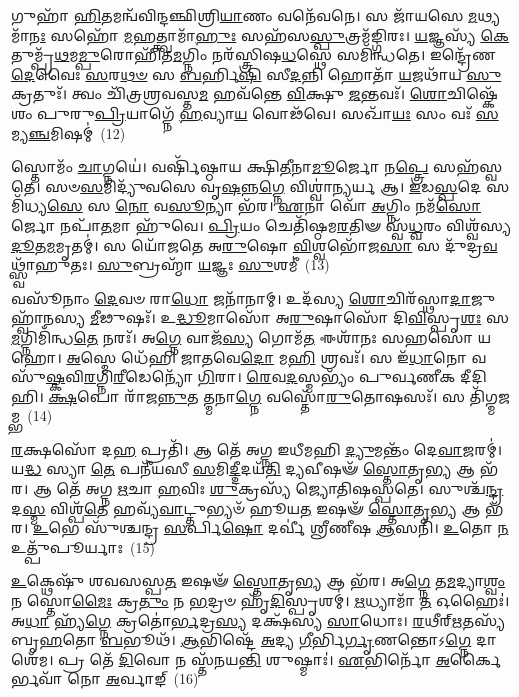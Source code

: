𑌗𑍁𑌹𑌾᳴ \ul{𑌹𑌿}\-𑌤𑌮𑌨𑍍𑌵᳴𑌵𑌿𑌨𑍍𑌦𑌞𑍍𑌛𑌿𑌶𑍍𑌰𑌿\-\ul{𑌯𑌾}\-𑌣𑌂 𑌵𑌨𑍇᳴𑌵𑌨𑍇। 𑌸 𑌜𑌾᳴𑌯𑌸𑍇 \ul{𑌮}\-𑌥𑍍𑌯𑌮𑌾᳴\-\ul{𑌨𑌃} 𑌸𑌹𑍋᳴ \ul{𑌮}\-𑌹𑌤𑍍𑌤𑍍𑌵𑌾𑌮𑌾᳴\-\ul{𑌹𑍁𑌃} 𑌸𑌹᳴𑌸\-\ul{𑌸𑍍𑌪𑍁}\-𑌤𑍍𑌰𑌮᳴𑌙𑍍𑌗𑌿𑌰𑌃। \ul{𑌯}\-𑌜𑍍𑌞𑌸𑍍𑌯᳴ \ul{𑌕𑍇}\-𑌤𑍁𑌮𑍍𑌪𑍍𑌰᳴\-\ul{𑌥}\-𑌮\-\ul{𑌮𑍍𑌪𑍁}\-𑌰𑍋𑌹𑌿᳴𑌤\-\ul{𑌮}\-𑌗𑍍𑌨𑌿𑌂 𑌨𑌰᳴𑌸𑍍𑌤𑍍𑌰𑌿𑌷\-\ul{𑌧}\-𑌸𑍍𑌥𑍇 𑌸𑌮𑌿᳴𑌨𑍍𑌧𑌤𑍇। 𑌇𑌨𑍍𑌦𑍍𑌰𑍇᳴𑌣 \ul{𑌦𑍇}\-𑌵𑍈𑌃 \ul{𑌸}\-𑌰\-\ul{𑌥}\-\-\ul{𑍞} 𑌸 \ul{𑌬}\-𑌰𑍍\mbox{}𑌹𑌿\-\ul{𑌷𑌿} 𑌸𑍀\-\ul{𑌦}\-𑌨𑍍𑌨𑌿 𑌹𑍋𑌤𑌾᳴ \ul{𑌯}\-𑌜𑌥𑌾᳴𑌯 \ul{𑌸𑍁}\-𑌕𑍍𑌰𑌤𑍁𑌃᳴। 𑌤𑍍𑌵𑌂 𑌚𑌿᳴𑌤𑍍𑌰𑌶𑍍𑌰𑌵𑌸𑍍𑌤\-\ul{𑌮} 𑌹𑌵᳴𑌨𑍍𑌤𑍇 \ul{𑌵𑌿}\-𑌕𑍍𑌷𑍁 \ul{𑌜}\-𑌨𑍍𑌤𑌵𑌃᳴। \ul{𑌶𑍋}\-𑌚𑌿𑌷𑍍𑌕𑍇᳴𑌶𑌂 𑌪𑍁𑌰𑍁\-\ul{𑌪𑍍𑌰𑌿}\-𑌯𑌾𑌗𑍍𑌨𑍇᳴ \ul{𑌹}\-𑌵𑍍𑌯𑌾\-\ul{𑌯} 𑌵𑍋𑌢᳴𑌵𑍇। 𑌸𑌖𑌾᳴\-\ul{𑌯𑌃} 𑌸𑌂 𑌵𑌃᳴ \ul{𑌸}\-𑌮𑍍𑌯\-\ul{𑌞𑍍𑌚}\-𑌮𑌿𑌷𑌮𑍍॑~(12)

𑌸𑍍𑌤𑍋𑌮𑌂᳴ \ul{𑌚𑌾}\-𑌗𑍍𑌨𑌯𑍇॑। 𑌵𑌰𑍍\mbox{}𑌷𑌿᳴𑌷𑍍𑌠𑌾𑌯 𑌕𑍍𑌷𑌿\-\ul{𑌤𑍀}\-𑌨𑌾\-\ul{𑌮𑍂}\-𑌰𑍍𑌜𑍋 𑌨\-\ul{𑌪𑍍𑌤𑍍𑌰𑍇} 𑌸𑌹᳴𑌸𑍍𑌵𑌤𑍇। 𑌸𑍞\-\ul{𑌸}\-𑌮𑌿𑌦𑍍𑌯𑍁᳴𑌵𑌸𑍇 𑌵𑍃\-\ul{𑌷}\-𑌨𑍍𑌨\-\ul{𑌗𑍍𑌨𑍇} 𑌵𑌿𑌶𑍍𑌵𑌾॑\-\ul{𑌨𑍍𑌯}\-𑌰𑍍𑌯 𑌆। \ul{𑌇}\-𑌡\-\ul{𑌸𑍍𑌪}\-𑌦𑍇 𑌸𑌮𑌿᳴𑌧𑍍𑌯\-\ul{𑌸𑍇} 𑌸 \ul{𑌨𑍋} 𑌵\-\ul{𑌸𑍂}\-𑌨𑍍𑌯𑌾 𑌭᳴𑌰। \ul{𑌏}\-𑌨𑌾 𑌵𑍋᳴ \ul{𑌅}\-𑌗𑍍𑌨𑌿𑌂 𑌨𑌮᳴\-\ul{𑌸𑍋}\-𑌰𑍍𑌜𑍋 𑌨𑌪𑌾᳴\-\ul{𑌤}\-𑌮𑌾 𑌹𑍁᳴𑌵𑍇। \ul{𑌪𑍍𑌰𑌿}\-𑌯𑌂 𑌚𑍇𑌤𑌿᳴𑌷𑍍𑌠𑌮\-\ul{𑌰}\-𑌤𑌿𑍟 𑌸𑍍𑌵᳴\-\ul{𑌧𑍍𑌵}\-𑌰𑌂 𑌵𑌿𑌶𑍍𑌵᳴𑌸𑍍𑌯 \ul{𑌦𑍂}\-𑌤\-\ul{𑌮}\-𑌮𑍃𑌤𑌮𑍍॑। 𑌸 𑌯𑍋᳴𑌜𑌤𑍇 𑌅\-\ul{𑌰𑍁}\-𑌷𑍋 \ul{𑌵𑌿}\-𑌶𑍍𑌵𑌭𑍋᳴𑌜\-\ul{𑌸𑌾} 𑌸 𑌦𑍁᳴𑌦𑍍𑌰\-\ul{𑌵}\-𑌥𑍍𑌸𑍍𑌵𑌾᳴𑌹𑍁𑌤𑌃। \ul{𑌸𑍁}\-𑌬𑍍𑌰𑌹𑍍𑌮𑌾᳴ \ul{𑌯}\-𑌜𑍍𑌞𑌃 \ul{𑌸𑍁}\-𑌶𑌮𑍀॑~(13)

𑌵𑌸𑍂᳴𑌨𑌾𑌂 \ul{𑌦𑍇}\-𑌵𑍞 𑌰𑌾\-\ul{𑌧𑍋} 𑌜𑌨𑌾᳴𑌨𑌾𑌮𑍍। 𑌉𑌦᳴𑌸𑍍𑌯 \ul{𑌶𑍋}\-𑌚𑌿𑌰᳴𑌸𑍍𑌥𑌾\-\ul{𑌦𑌾}\-𑌜𑍁𑌹𑍍𑌵𑌾᳴𑌨𑌸𑍍𑌯 \ul{𑌮𑍀}\-𑌢𑍁𑌷𑌃᳴। 𑌉\-\ul{𑌦𑍍𑌧𑍂}\-𑌮𑌾𑌸𑍋᳴ 𑌅\-\ul{𑌰𑍁}\-𑌷𑌾𑌸𑍋᳴ 𑌦𑌿\-\ul{𑌵𑌿}\-𑌸𑍍𑌪𑍃\-\ul{𑌶𑌃} 𑌸\-\ul{𑌮}\-𑌗𑍍𑌨𑌿𑌮𑌿᳴𑌨𑍍𑌧\-\ul{𑌤𑍇} 𑌨𑌰𑌃᳴। 𑌅\-\ul{𑌗𑍍𑌨𑍇} 𑌵𑌾𑌜᳴\-\ul{𑌸𑍍𑌯} 𑌗𑍋𑌮᳴\-\ul{𑌤} 𑌈𑌶𑌾᳴𑌨𑌃 𑌸𑌹𑌸𑍋 𑌯𑌹𑍋। \ul{𑌅}\-𑌸𑍍𑌮𑍇 𑌧𑍇᳴𑌹𑌿 𑌜𑌾𑌤𑌵𑍇\-\ul{𑌦𑍋} 𑌮\-\ul{𑌹𑌿} 𑌶𑍍𑌰𑌵𑌃᳴। 𑌸 𑌇᳴\-\ul{𑌧𑌾}\-𑌨𑍋 𑌵𑌸𑍁᳴\-\ul{𑌷𑍍𑌕}\-𑌵𑌿\-\ul{𑌰}\-𑌗𑍍𑌨𑌿\-\ul{𑌰𑍀}\-𑌡𑍇𑌨𑍍𑌯𑍋᳴ \ul{𑌗𑌿}\-𑌰𑌾। \ul{𑌰𑍇}\-𑌵\-\ul{𑌦}\-𑌸𑍍𑌮𑌭𑍍𑌯𑌂᳴ 𑌪𑍁𑌰𑍍𑌵𑌣𑍀𑌕 𑌦𑍀𑌦𑌿𑌹𑌿। \ul{𑌕𑍍𑌷}\-𑌪𑍋 𑌰𑌾᳴𑌜\-\ul{𑌨𑍍𑌨𑍁}\-𑌤 𑌤𑍍𑌮𑌨𑌾\-\ul{𑌗𑍍𑌨𑍇} 𑌵𑌸𑍍𑌤𑍋᳴\-\ul{𑌰𑍁}\-𑌤𑍋𑌷𑌸𑌃᳴। 𑌸 𑌤𑌿᳴𑌗𑍍𑌮𑌜𑌮𑍍𑌭~(14)

\-\ul{𑌰}\-𑌕𑍍𑌷𑌸𑍋᳴ 𑌦\-\ul{𑌹} 𑌪𑍍𑌰𑌤𑌿᳴। 𑌆 𑌤𑍇᳴ 𑌅𑌗𑍍𑌨 𑌇𑌧𑍀𑌮𑌹𑌿 \ul{𑌦𑍍𑌯𑍁}\-𑌮𑌨𑍍𑌤𑌂᳴ 𑌦𑍇\-\ul{𑌵𑌾}\-𑌜𑌰𑌮𑍍॑। 𑌯\-\ul{𑌦𑍍𑌧} 𑌸𑍍𑌯𑌾 \ul{𑌤𑍇} 𑌪𑌨𑍀᳴𑌯𑌸𑍀 \ul{𑌸}\-𑌮𑌿\-\ul{𑌦𑍍𑌦𑍀}\-𑌦𑌯᳴\-\ul{𑌤𑌿} 𑌦𑍍𑌯𑌵𑍀𑌷𑍟᳴ \ul{𑌸𑍍𑌤𑍋}\-𑌤𑍃\-\ul{𑌭𑍍𑌯} 𑌆 𑌭᳴𑌰। 𑌆 𑌤𑍇᳴ 𑌅𑌗𑍍𑌨 \ul{𑌋}\-𑌚𑌾 \ul{𑌹}\-𑌵𑌿𑌃 \ul{𑌶𑍁}\-𑌕𑍍𑌰𑌸𑍍𑌯᳴ 𑌜𑍍𑌯𑍋𑌤𑌿𑌷𑌸𑍍𑌪𑌤𑍇। 𑌸𑍁𑌶𑍍𑌚᳴\-\ul{𑌨𑍍𑌦𑍍𑌰} 𑌦\-\ul{𑌸𑍍𑌮} 𑌵𑌿𑌶𑍍𑌪᳴\-\ul{𑌤𑍇} 𑌹𑌵𑍍𑌯᳴\-\ul{𑌵𑌾}\-𑌟𑍍𑌤𑍁𑌭𑍍𑌯𑍞᳴ 𑌹𑍂𑌯\-\ul{𑌤} 𑌇𑌷𑍟᳴ \ul{𑌸𑍍𑌤𑍋}\-𑌤𑍃\-\ul{𑌭𑍍𑌯} 𑌆 𑌭᳴𑌰। \ul{𑌉}\-𑌭𑍇 𑌸𑍁᳴𑌶𑍍𑌚𑌨𑍍𑌦𑍍𑌰 \ul{𑌸}\-𑌰𑍍𑌪𑌿\-\ul{𑌷𑍋} 𑌦𑌰𑍍𑌵𑍀॑ 𑌶𑍍𑌰𑍀𑌣𑍀𑌷 \ul{𑌆}\-𑌸𑌨𑌿᳴। \ul{𑌉}\-𑌤𑍋 \ul{𑌨} 𑌉𑌤𑍍𑌪𑍁᳴𑌪𑍂𑌰𑍍𑌯𑌾𑌃~(15)

\-\ul{𑌉}\-𑌕𑍍𑌥𑍇𑌷𑍁᳴ 𑌶𑌵𑌸𑌸𑍍𑌪\-\ul{𑌤} 𑌇𑌷𑍟᳴ \ul{𑌸𑍍𑌤𑍋}\-𑌤𑍃\-\ul{𑌭𑍍𑌯} 𑌆 𑌭᳴𑌰। 𑌅\-\ul{𑌗𑍍𑌨𑍇} 𑌤\-\ul{𑌮}\-𑌦𑍍𑌯𑌾\-\ul{𑌶𑍍𑌵𑌂} 𑌨 𑌸𑍍𑌤𑍋\-\ul{𑌮𑍈𑌃} 𑌕𑍍𑌰\-\ul{𑌤𑍁𑌂} 𑌨 \ul{𑌭}\-𑌦𑍍𑌰𑍞 𑌹𑍃᳴\-\ul{𑌦𑌿}\-𑌸𑍍𑌪𑍃𑌶𑌮𑍍॑। \ul{𑌋}\-𑌧𑍍𑌯𑌾𑌮𑌾᳴ \ul{𑌤} 𑌓𑌹𑍈𑌃॑। 𑌅\-\ul{𑌧𑌾} 𑌹𑍍𑌯᳴\-\ul{𑌗𑍍𑌨𑍇} 𑌕𑍍𑌰𑌤𑍋॑\-\ul{𑌰𑍍𑌭}\-𑌦𑍍𑌰\-\ul{𑌸𑍍𑌯} 𑌦𑌕𑍍𑌷᳴𑌸𑍍𑌯 \ul{𑌸𑌾}\-𑌧𑍋𑌃। \ul{𑌰}\-𑌥𑍀𑌰𑍍\mbox{}\-\ul{𑌋}\-𑌤𑌸𑍍𑌯᳴ 𑌬𑍃\-\ul{𑌹}\-𑌤𑍋 \ul{𑌬}\-𑌭𑍂𑌥᳴। \ul{𑌆}\-𑌭𑌿𑌷𑍍𑌟𑍇᳴ \ul{𑌅}\-𑌦𑍍𑌯 \ul{𑌗𑍀}\-𑌰𑍍𑌭𑌿\-\ul{𑌰𑍍𑌗𑍃}\-𑌣𑌨𑍍𑌤𑍋\-𑌽\-\ul{𑌗𑍍𑌨𑍇} 𑌦𑌾𑌶𑍇᳴𑌮। 𑌪𑍍𑌰 𑌤𑍇᳴ \ul{𑌦𑌿}\-𑌵𑍋 𑌨 𑌸𑍍𑌤᳴𑌨𑌯\-\ul{𑌨𑍍𑌤𑌿} 𑌶𑍁𑌷𑍍𑌮𑌾𑌃॑। \ul{𑌏}\-𑌭𑌿𑌰𑍍𑌨𑍋᳴ \ul{𑌅}\-𑌰𑍍𑌕𑍈𑌰𑍍𑌭𑌵𑌾᳴ 𑌨𑍋 \ul{𑌅}\-𑌰𑍍𑌵𑌾𑌙𑍍~(16)

